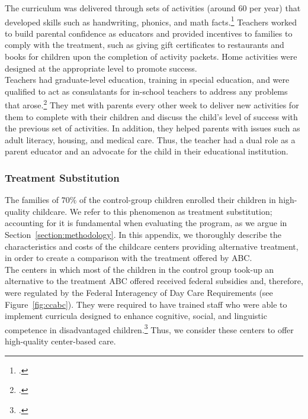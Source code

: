 \begin{appendices}
\noindent The curriculum was delivered through sets of activities (around 60 per year) that developed skills such as handwriting, phonics, and math facts.\footnote{\cite{Campbell-Ramey_1989_Preschool-vs-School-age}.} Teachers worked to build parental confidence as educators and provided incentives to families to comply with the treatment, such as giving gift certificates to restaurants and books for children upon the completion of activity packets. Home activities were designed at the appropriate level to promote success.\\

\noindent Teachers had graduate-level education, training in special education, and were qualified to act as consulatants for in-school teachers to address any problems that arose.\footnote{\cite{Ramey_Campbell_1991_childreninpoverty}.} They met with parents every other week to deliver new activities for them to complete with their children and discuss the child's level of success with the previous set of activities. In addition, they helped parents with issues such as adult literacy, housing, and medical care. Thus, the teacher had a dual role as a parent educator and an advocate for the child in their educational institution.

\subsubsection{Treatment Substitution}

\noindent The families of $70\%$ of the control-group children enrolled their children in high-quality childcare. We refer to this phenomenon as treatment substitution; accounting for it is fundamental when evaluating the program, as we argue in Section~\ref{section:methodology}. In this appendix, we thoroughly describe the characteristics and costs of the childcare centers providing alternative treatment, in order to create a comparison with the treatment offered by ABC.\\

\noindent The centers in which most of the children in the control group took-up an alternative to the treatment ABC offered received federal subsidies and, therefore, were regulated by the Federal Interagency of Day Care Requirements (see Figure~\ref{fig:ccabc}). They were required to have trained staff who were able to implement curricula designed to enhance cognitive, social, and linguistic competence in disadvantaged children.\footnote{\citet{Burchinal_etal_1989_CD_Daycare-Pre-K-Dev}.} Thus, we consider these centers to offer high-quality center-based care.


\end{appendices}

